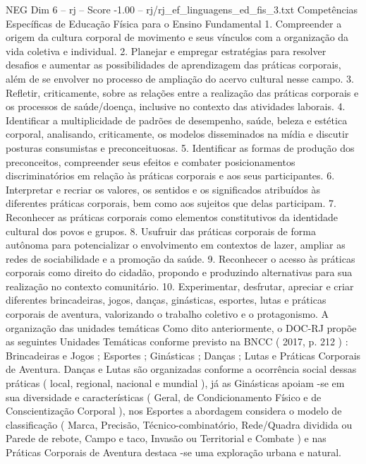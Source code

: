\begin{textsample}{NEG Dim 6 – rj – Score -1.00 – rj/rj\_ef\_linguagens\_ed\_fis\_3.txt}  \label{ex:f6_neg_001}
Competências Específicas de Educação Física para o Ensino Fundamental 1.
Compreender a origem da cultura corporal de movimento e seus vínculos com a organização da vida coletiva e individual. 2.
Planejar e empregar estratégias para resolver desafios e aumentar as possibilidades de aprendizagem das práticas corporais, além de se envolver no processo de ampliação do acervo cultural nesse campo. 3.
Refletir, criticamente, sobre as relações entre a realização das práticas corporais e os processos de saúde/doença, inclusive no contexto das atividades laborais. 4.
Identificar a multiplicidade de padrões de desempenho, saúde, beleza e estética corporal, analisando, criticamente, os modelos disseminados na mídia e discutir posturas consumistas e preconceituosas. 5.
Identificar as formas de produção dos preconceitos, compreender seus efeitos e combater posicionamentos discriminatórios em relação às práticas corporais e aos seus participantes. 6.
Interpretar e recriar os valores, os sentidos e os significados atribuídos às diferentes práticas corporais, bem como aos sujeitos que delas participam. 7.
Reconhecer as práticas corporais como elementos constitutivos da identidade cultural dos povos e grupos. 8.
Usufruir das práticas corporais de forma autônoma para potencializar o envolvimento em contextos de lazer, ampliar as redes de sociabilidade e a promoção da saúde. 9.
Reconhecer o acesso às práticas corporais como direito do cidadão, propondo e produzindo alternativas para sua realização no contexto comunitário. 10.
Experimentar, desfrutar, apreciar e criar diferentes brincadeiras, jogos, danças, ginásticas, esportes, lutas e práticas corporais de aventura, valorizando o trabalho coletivo e o protagonismo.
A organização das unidades temáticas Como dito anteriormente, o DOC-RJ propõe as seguintes Unidades Temáticas conforme previsto na BNCC ( 2017, p. 212 ) : Brincadeiras e Jogos ; Esportes ; Ginásticas ; Danças ; Lutas e Práticas Corporais de Aventura.
Danças e Lutas são organizadas conforme a ocorrência social dessas práticas ( local, regional, nacional e mundial ), já as Ginásticas apoiam -se em sua diversidade e características ( Geral, de Condicionamento Físico e de Conscientização Corporal ), nos Esportes a abordagem considera o modelo de classificação ( Marca, Precisão, Técnico-combinatório, Rede/Quadra dividida ou Parede de rebote, Campo e taco, Invasão ou Territorial e Combate ) e nas Práticas Corporais de Aventura destaca -se uma exploração urbana e natural.

\end{textsample}

